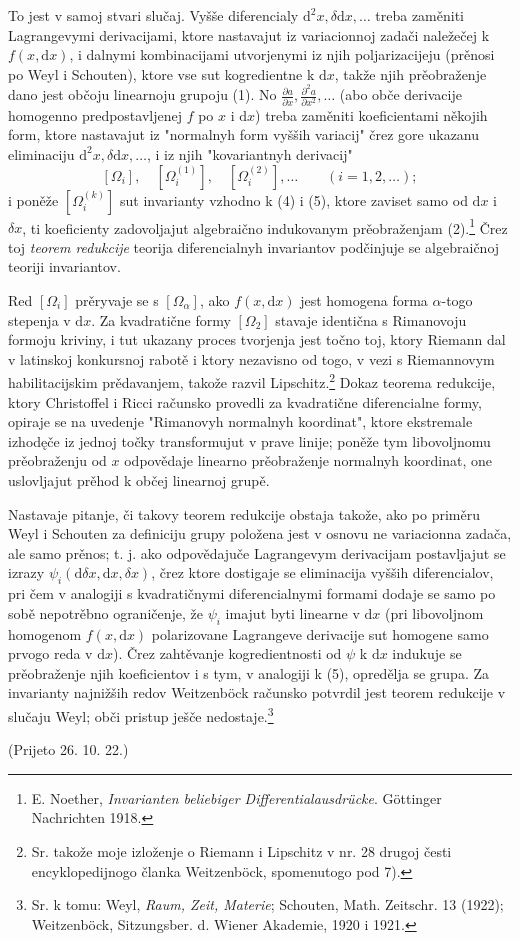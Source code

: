 \documentclass[11pt]{article}
\providecommand{\dd}{\mathrm d}
\begin{document}
To jest v samoj stvari slučaj. Vyšše diferencialy $\dd^2x,\delta\dd x,\ldots$ treba zaměniti Lagrangevymi derivacijami, ktore nastavajut iz variacionnoj zadači naležečej k $f(x,\dd x)$, i dalnymi kombinacijami utvorjenymi iz njih poljarizacijeju (prěnosi po Weyl i Schouten), ktore vse sut kogredientne k $\dd x$, takže njih prěobraženje dano jest občoju linearnoju grupoju (1). No $\frac{\partial a}{\partial x},\frac{\partial^2a}{\partial x^2},\ldots$ (abo obče derivacije homogenno predpostavljenej $f$ po $x$ i $\dd x$) treba zaměniti koeficientami někojih form, ktore nastavajut iz "normalnyh form vyšših variacij" črez gore ukazanu eliminaciju $\dd^2x,\delta\dd x,\ldots$, i iz njih "kovariantnyh derivacij"
\[
 [\Omega_i],\quad [\Omega_i^{(1)}],\quad [\Omega_i^{(2)}],\ldots\qquad (i=1,2,\ldots);
\]
i poněže $[\Omega_i^{(k)}]$ sut invarianty vzhodno k (4) i (5), ktore zaviset samo od $\dd x$ i $\delta x$, ti koeficienty zadovoljajut algebraično indukovanym prěobraženjam (2).\footnote{E. Noether, \emph{Invarianten beliebiger Differentialausdrücke}. Göttinger Nachrichten 1918.} Črez toj \emph{teorem redukcije} teorija diferencialnyh invariantov podčinjuje se algebraičnoj teoriji invariantov.

Red $[\Omega_i]$ prěryvaje se s $[\Omega_\alpha]$, ako $f(x,\dd x)$ jest homogena forma $\alpha$-togo stepenja v $\dd x$. Za kvadratične formy $[\Omega_2]$ stavaje identična s Rimanovoju formoju kriviny, i tut ukazany proces tvorjenja jest točno toj, ktory Riemann dal v latinskoj konkursnoj rabotě i ktory nezavisno od togo, v vezi s Riemannovym habilitacijskim prědavanjem, takože razvil Lipschitz.\footnote{Sr. takože moje izloženje o Riemann i Lipschitz v nr. 28 drugoj česti encyklopedijnogo članka Weitzenböck, spomenutogo pod 7).} Dokaz teorema redukcije, ktory Christoffel i Ricci računsko provedli za kvadratične diferencialne formy, opiraje se na uvedenje "Rimanovyh normalnyh koordinat", ktore ekstremale izhodęče iz jednoj točky transformujut v prave linije; poněže tym libovoljnomu prěobraženju od $x$ odpovědaje linearno prěobraženje normalnyh koordinat, one uslovljajut prěhod k občej linearnoj grupě.

Nastavaje pitanje, či takovy teorem redukcije obstaja takože, ako po priměru Weyl i Schouten za definiciju grupy položena jest v osnovu ne variacionna zadača, ale samo prěnos; t. j. ako odpovědajuče Lagrangevym derivacijam postavljajut se izrazy $\psi_i(\dd\delta x,\dd x,\delta x)$, črez ktore dostigaje se eliminacija vyšših diferencialov, pri čem v analogiji s kvadratičnymi diferencialnymi formami dodaje se samo po sobě nepotrěbno ograničenje, že $\psi_i$ imajut byti linearne v $\dd x$ (pri libovoljnom homogenom $f(x,\dd x)$ polarizovane Lagrangeve derivacije sut homogene samo prvogo reda v $\dd x$). Črez zahtěvanje kogredientnosti od $\psi$ k $\dd x$ indukuje se prěobraženje njih koeficientov i s tym, v analogiji k (5), opredělja se grupa. Za invarianty najnižših redov Weitzenböck računsko potvrdil jest teorem redukcije v slučaju Weyl; obči pristup ješče nedostaje.\footnote{Sr. k tomu: Weyl, \emph{Raum, Zeit, Materie}; Schouten, Math. Zeitschr. 13 (1922); Weitzenböck, Sitzungsber. d. Wiener Akademie, 1920 i 1921.}

\begin{center}
(Prijeto 26. 10. 22.)
\end{center}
\end{document}
